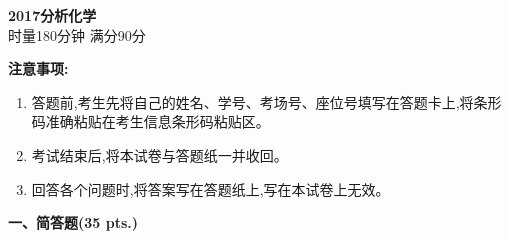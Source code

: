 \begin{center}
    {\LARGE \textbf{2017分析化学}} \\[2ex]
    {\large 时量180分钟 \quad 满分90分}
\end{center}

\vspace{0.5cm}
\noindent\textbf{注意事项:}
\begin{enumerate}[label=\arabic*., parsep=0pt, itemsep=0pt]
    \item 答题前,考生先将自己的姓名、学号、考场号、座位号填写在答题卡上,将条形码准确粘贴在考生信息条形码粘贴区。
    \item 考试结束后,将本试卷与答题纸一并收回。
    \item 回答各个问题时,将答案写在答题纸上,写在本试卷上无效。
\end{enumerate}

\vspace{0.5cm}
\noindent\textbf{一、简答题(35 pts.)}

